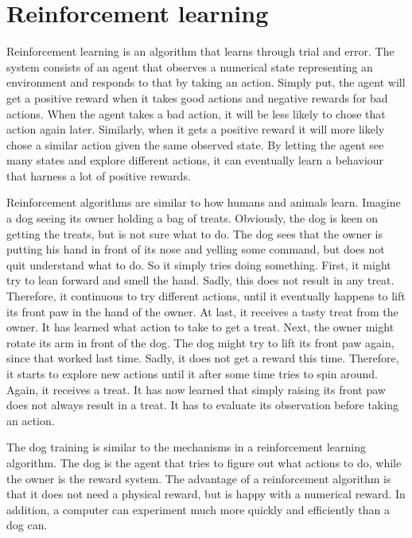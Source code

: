 \documentclass[class=book, crop=false, 11pt]{standalone}
\begin{document}
\chapter{Reinforcement learning}
Reinforcement learning is an algorithm that learns through trial and error. The system consists of an agent that observes a numerical state representing an environment and responds to that by taking an action. Simply put, the agent will get a positive reward when it takes good actions and negative rewards for bad actions. When the agent takes a bad action, it will be less likely to chose that action again later. Similarly, when it gets a positive reward it will more likely chose a similar action given the same observed state. By letting the agent see many states and explore different actions, it can eventually learn a behaviour that harness a lot of positive rewards. 

Reinforcement algorithms are similar to how humans and animals learn. Imagine a dog seeing its owner holding a bag of treats. Obviously, the dog is keen on getting the treats, but is not sure what to do. The dog sees that the owner is putting his hand in front of its nose and yelling some command, but does not quit understand what to do. So it simply tries doing something. First, it might try to lean forward and smell the hand. Sadly, this does not result in any treat. Therefore, it continuous to try different actions, until it eventually happens to lift its front paw in the hand of the owner. At last, it receives a tasty treat from the owner. It has learned what action to take to get a treat. Next, the owner might rotate its arm in front of the dog. The dog might try to lift its front paw again, since that worked last time. Sadly, it does not get a reward this time. Therefore, it starts to explore new actions until it after some time tries to spin around. Again, it receives a treat. It has now learned that simply raising its front paw does not always result in a treat. It has to evaluate its observation before taking an action. 

The dog training is similar to the mechanisms in a reinforcement learning algorithm. The dog is the agent that tries to figure out what actions to do, while the owner is the reward system. The advantage of a reinforcement algorithm is that it does not need a physical reward, but is happy with a numerical reward. In addition, a computer can experiment much more quickly and efficiently than a dog can. 
\end{document}
